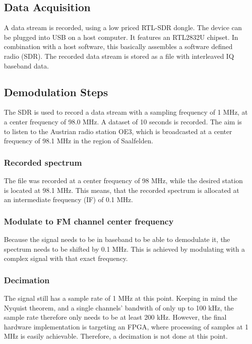 \documentclass[conference]{IEEEtran}
\begin{document}

  \subsection{Data Acquisition}
    A data stream is recorded, using a low priced RTL-SDR dongle.
    The device can be plugged into USB on a host computer.
    It features an RTL2832U chipset.
    In combination with a host software, this basically assembles a software defined radio (SDR).
    The recorded data stream is stored as a file with interleaved IQ baseband data.

  \subsection{Demodulation Steps}
    The SDR is used to record a data stream with a sampling frequency of 1 MHz, at a center frequency of 98.0 MHz. A dataset of 10 seconds is recorded.
    The aim is to listen to the Austrian radio station OE3, which is broadcasted at a center frequency of 98.1 MHz in the region of Saalfelden.

    \subsubsection{Recorded spectrum}
      The file was recorded at a center frequency of 98 MHz, while the desired station is located at 98.1 MHz.
      This means, that the recorded spectrum is allocated at an intermediate frequency (IF) of 0.1 MHz.

    \subsubsection{Modulate to FM channel center frequency}
      Because the signal needs to be in baseband to be able to demodulate it, the spectrum needs to be shifted by 0.1 MHz.
      This is achieved by modulating with a complex signal with that exact frequency.

    \subsubsection{Decimation}
      The signal still has a sample rate of 1 MHz at this point.
      Keeping in mind the Nyquist theorem, and a single channels' bandwith of only up to 100 kHz, the sample rate therefore only needs to be at least 200 kHz.
      However, the final hardware implementation is targeting an FPGA, where processing of samples at 1 MHz is easily achievable. Therefore, a decimation is not done at this point.
\end{document}
